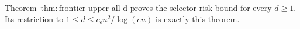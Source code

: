 Theorem~\(\mathrm{thm:frontier\text{-}upper\text{-}all\text{-}d}\) proves the selector risk bound for every \(d\ge1\).  Its restriction to \(1\le d\le c_{\epsilon}n^2/\log(en)\) is exactly this theorem.